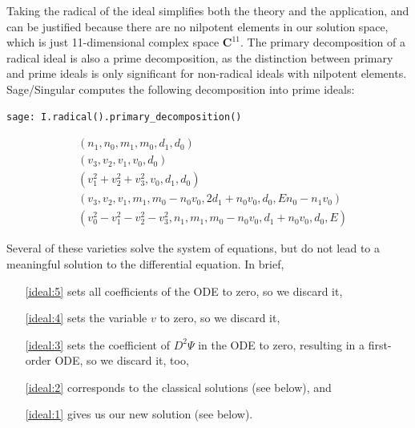 \documentclass{article}
\begin{document}
Taking the radical of the ideal simplifies both the theory and the application,
and can be justified because there are no nilpotent elements in our solution
space, which is just 11-dimensional complex space ${\mathbf C}^{11}$.  The
primary decomposition of a radical ideal is also a prime decomposition,
as the distinction between primary and prime ideals is only significant
for non-radical ideals with nilpotent elements.  Sage/Singular computes
the following decomposition into prime ideals:

\begin{verbatim}
sage: I.radical().primary_decomposition()
\end{verbatim}

\begin{subequations}
\label{ideal}
\begin{align}
& \left(n_{1}, n_{0}, m_{1}, m_{0}, d_{1}, d_{0}\right)\label{ideal:5} \\
& \left(v_{3}, v_{2}, v_{1}, v_{0}, d_{0}\right)\label{ideal:4}\\
& \left(v_{1}^{2} + v_{2}^{2} + v_{3}^{2}, v_{0}, d_{1}, d_{0}\right)\label{ideal:3}\\
& \left(v_{3}, v_{2}, v_{1}, m_{1}, m_{0} - n_{0} v_{0}, 2 d_{1} + n_{0} v_{0}, d_{0}, E n_{0} - n_{1} v_{0}\right)\label{ideal:2}\\
& \left(v_{0}^{2} - v_{1}^{2} - v_{2}^{2} - v_{3}^{2}, n_{1}, m_{1}, m_{0} - n_{0} v_{0}, d_{1} + n_{0} v_{0}, d_{0}, E\right)\label{ideal:1}
\end{align}
\end{subequations}

Several of these varieties solve the system of equations, but do not lead to a meaningful solution to the differential equation.
In brief,

\begin{itemize}
\item[\eqref{ideal:5}] sets all coefficients of the ODE to zero, so we discard it,
\item[\eqref{ideal:4}] sets the variable $v$ to zero, so we discard it,
\item[\eqref{ideal:3}] sets the coefficient of
$D^2\Psi$
in the ODE to zero, resulting in a first-order ODE, so we discard it, too,
\item[\eqref{ideal:2}] corresponds to the classical solutions (see below), and
\item[\eqref{ideal:1}] gives us our new solution (see below).

\end{itemize}
\end{document}
